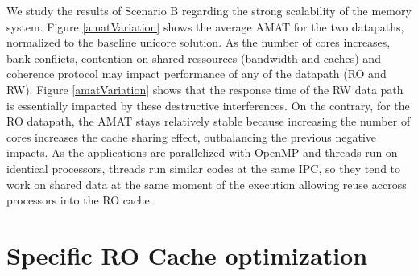 \documentclass[sigconf]{acmart}
\begin{document}
We study the results of Scenario B regarding the strong scalability of the memory system. Figure \ref{amatVariation} shows the average AMAT for the two datapaths, normalized to the baseline unicore solution. As the number of cores increases, bank conflicts, contention on shared ressources (bandwidth and caches) and coherence protocol may impact performance of any of the datapath (RO and RW). Figure \ref{amatVariation} shows that the response time of the RW data path is essentially impacted by these destructive interferences. On the contrary, for the RO datapath, the AMAT stays relatively stable because increasing the number of cores increases the cache sharing effect, outbalancing the previous negative impacts. As the applications are parallelized with OpenMP and threads run on identical processors, threads run similar codes at the same IPC, so they tend to work on shared data at the same moment of the execution allowing reuse accross processors into the RO cache.

 
\section{Specific RO Cache optimization}
\end{document}
